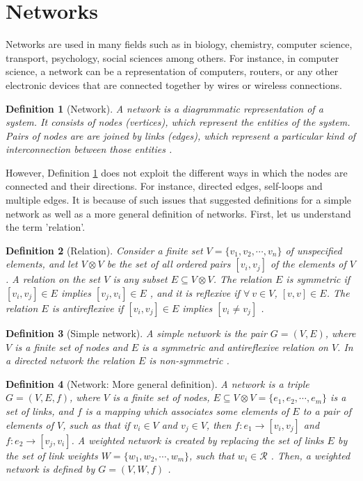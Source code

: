 \documentclass[10pt,a4paper]{article}
\newtheorem{defn}{Definition}
\begin{document}
\section{Networks}
Networks are used in many fields such as in biology, chemistry, computer science, transport, psychology, social sciences among others. For instance, in computer science, a network can be a representation of computers, routers, or any other electronic devices that are connected together by wires or wireless connections. 
\begin{defn}[Network]
	A network is a diagrammatic representation of a system. It consists of nodes (vertices), which represent the entities of the system. Pairs of nodes are are joined by links (edges), which represent a particular kind of interconnection between those entities \citep{estrada2011structure}.
	\label{def:network}
\end{defn}
However, Definition \ref{def:network} does not exploit the different ways in which the nodes are connected and their directions. For instance, directed edges, self-loops and multiple edges. It is because of such issues that \cite{gutman2012mathematical} suggested definitions for a simple network as well as a more general definition of networks. First, let us understand the term 'relation'.

\begin{defn}[Relation]
	Consider a finite set $V=\{v_1,v_2, \cdots,v_n \}$ of unspecified elements, and let $V \otimes V$ be the set of all ordered pairs $[v_i,v_j]$ of the elements of $V$.
	A relation on the set $V$ is any subset $E \subseteq V \otimes V$. The relation $E$ is symmetric if $[v_i, v_j] \in E$ implies $[v_j, v_i] \in E$ , and it is reflexive if $\forall~ v \in V$, $[v,v] \in E$. The relation $E$ is antireflexive if $[v_i,v_j] \in E$ implies $[v_i \neq v_j]$ \citep{estrada2011structure}.
\end{defn}

\begin{defn}[Simple network]
	A simple network is the pair $G=(V,E)$, where $V$ is a finite set of nodes and $E$ is a symmetric and antireflexive relation on $V$. In a directed network the relation $E$ is non-symmetric \citep{estrada2011structure}.
\end{defn}
\begin{defn}[Network: More general definition]
	A network is a triple $ G = (V,E,f)$, where $V$ is a finite set of nodes, $E \subseteq V \otimes V = \{e_1,e_2,\cdots,e_m \} $ is a set of links, and $f$ is a mapping which associates some elements of $E$ to a pair of elements of $V$, such as that if $v_i \in V$ and $v_j \in V$, then $f: e_1 \rightarrow [v_i,v_j]$ and $f:e_2 \rightarrow [v_j,v_i]$. A weighted network is created by replacing the set of links $E$ by the set of link weights   
	$W=\{w_1,w_2,\cdots,w_m \}$, such that $w_i \in \mathcal{R}$ . Then, a weighted network is defined by $G=(V,W,f)$ \citep{estrada2011structure}.
\end{defn}
\end{document}
